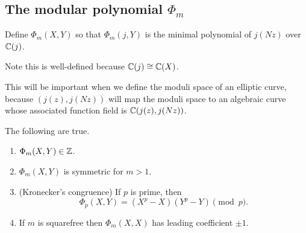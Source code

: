 \subsection{The modular polynomial $\Phi_m$}
\begin{df}
Define $\Phi_m(X,Y)$ so that $\Phi_m(j, Y)$ is the minimal polynomial of $j(Nz)$ over $\mathbb{C}(j)$. 
\end{df}
Note this is well-defined because $\mathbb{C}(j)\cong \mathbb{C}(X)$.

This will be important when we define the moduli space of an elliptic curve, because $(j(z),j(Nz))$ will map the moduli space to an algebraic curve whose associated function field is $\mathbb{C}(j(z), j(Nz))$.
\begin{pr}\label{phim}
The following are true.
\begin{enumerate}
\item
$\Phi_m(X,Y)\in \mathbb{Z}$.
\item
$\Phi_m(X,Y)$ is symmetric for $m>1$.
\item (Kronecker's congruence)
If $p$ is prime, then 
\[
\Phi_p(X,Y)=(X^p-X)(Y^p-Y)\pmod{p}.
\]
\item If $m$ is squarefree then $\Phi_m(X,X)$ has leading coefficient $\pm1$.
\end{enumerate}
\end{pr}
